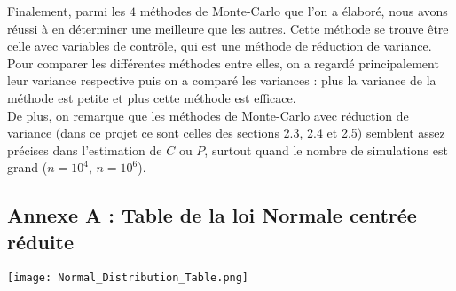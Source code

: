 \documentclass{article}
\theoremstyle{exostyle}
\begin{document}
\noindent Finalement, parmi les $4$ méthodes de Monte-Carlo que l'on a élaboré, nous avons réussi à en déterminer une meilleure que les autres. Cette méthode se trouve être celle avec variables de contrôle, qui est une méthode de réduction de variance. Pour comparer les différentes méthodes entre elles, on a regardé principalement leur variance respective puis on a comparé les variances : plus la variance de la méthode est petite et plus cette méthode est efficace. \\
De plus, on remarque que les méthodes de Monte-Carlo avec réduction de variance (dans ce projet ce sont celles des sections 2.3, 2.4 et 2.5) semblent assez précises dans l'estimation de $C$ ou $P$, surtout quand le nombre de simulations est grand ($n=10^{4}$, $n=10^{6}$).


\newpage

\begin{appendices}

\setcounter{page}{1}
\section{Annexe A : Table de la loi Normale centrée réduite}

\bigbreak
\bigbreak

\texttt{[image: Normal\_Distribution\_Table.png]}

\end{appendices}


\newpage
\end{document}
